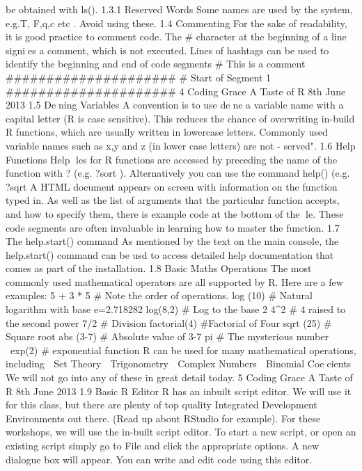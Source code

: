 be obtained with ls().
1.3.1 Reserved Words
Some names are used by the system, e.g.T, F,q,c etc . Avoid using these.
1.4 Commenting
For the sake of readability, it is good practice to comment code. The # character at the
beginning of a line signies a comment, which is not executed. Lines of hashtags can be used
to identify the beginning and end of code segments
# This is a comment
#####################
# Start of Segment 1
#####################
4
Coding Grace A Taste of R 8th June 2013
1.5 Dening Variables
A convention is to use dene a variable name with a capital letter (R is case sensitive). This
reduces the chance of overwriting in-build R functions, which are usually written in lowercase
letters. Commonly used variable names such as x,y and z (in lower case letters) are not \re-
served".
1.6 Help Functions
Help les for R functions are accessed by preceding the name of the function with ? (e.g. ?sort
). Alternatively you can use the command help() (e.g. ?sqrt
A HTML document appears on screen with information on the function typed in. As well
as the list of arguments that the particular function accepts, and how to specify them, there is
example code at the bottom of the le. These code segments are often invaluable in learning
how to master the function.
1.7 The help.start() command
As mentioned by the text on the main console, the help.start() command can be usd to
access detailed help documentation that comes as part of the installation.
1.8 Basic Maths Operations
The most commonly used mathematical operators are all supported by R. Here are a few
examples:
5 + 3 * 5 # Note the order of operations.
log (10) # Natural logarithm with base e=2.718282
log(8,2) # Log to the base 2
4^2 # 4 raised to the second power
7/2 # Division
factorial(4) #Factorial of Four
sqrt (25) # Square root
abs (3-7) # Absolute value of 3-7
pi # The mysterious number \\\
exp(2) # exponential function
R can be used for many mathematical operations, including
 Set Theory
 Trigonometry
 Complex Numbers
 Binomial Coecients
We will not go into any of these in great detail today.
5
Coding Grace A Taste of R 8th June 2013
1.9 Basic R Editor
R has an inbuilt script editor. We will use it for this class, but there are plenty of top quality
Integrated Development Environments out there. (Read up about RStudio for example).
For these workshops, we will use the in-built script editor.
To start a new script, or open an existing script simply go to File and click the appropriate
options. A new dialogue box will appear. You can write and edit code using this editor.
